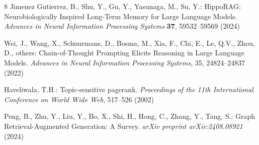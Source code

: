 \documentclass[runningheads]{llncs}
\begin{document}
\begin{thebibliography}{8}
Jimenez Gutierrez, B., Shu, Y., Gu, Y., Yasunaga, M., Su, Y.:
HippoRAG: Neurobiologically Inspired Long-Term Memory for Large Language Models.
\textit{Advances in Neural Information Processing Systems} \textbf{37}, 59532--59569 (2024)






Wei, J., Wang, X., Schuurmans, D., Bosma, M., Xia, F., Chi, E., Le, Q.V., Zhou, D., others:
Chain-of-Thought Prompting Elicits Reasoning in Large Language Models.
\textit{Advances in Neural Information Processing Systems}, 35, 24824--24837 (2022)

Haveliwala, T.H.:
Topic-sensitive pagerank.
\textit{Proceedings of the 11th International Conference on World Wide Web}, 517--526 (2002)

Peng, B., Zhu, Y., Liu, Y., Bo, X., Shi, H., Hong, C., Zhang, Y., Tang, S.:
Graph Retrieval-Augmented Generation: A Survey.
\textit{arXiv preprint arXiv:2408.08921} (2024)


\end{thebibliography}
\end{document}
